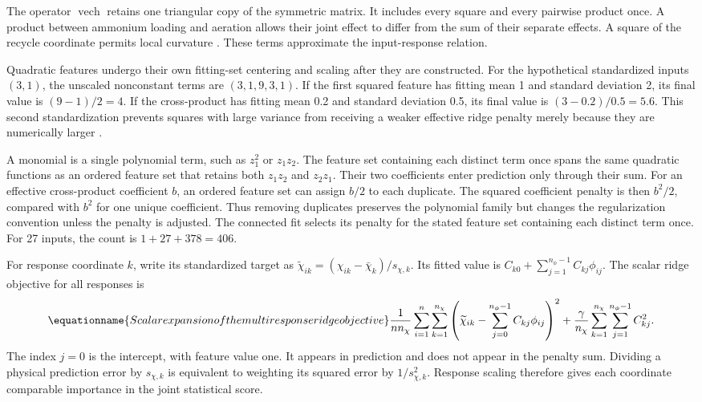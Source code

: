 The operator $\operatorname{vech}$ retains one triangular copy of the symmetric matrix. It includes every square and every pairwise product once. A product between ammonium loading and aeration allows their joint effect to differ from the sum of their separate effects. A square of the recycle coordinate permits local curvature \citep{Nazlabadi2021,Selerio2026}. These terms approximate the input-response relation.

Quadratic features undergo their own fitting-set centering and scaling after they are constructed. For the hypothetical standardized inputs $(3,1)$, the unscaled nonconstant terms are $(3,1,9,3,1)$. If the first squared feature has fitting mean 1 and standard deviation 2, its final value is $(9-1)/2=4$. If the cross-product has fitting mean 0.2 and standard deviation 0.5, its final value is $(3-0.2)/0.5=5.6$. This second standardization prevents squares with large variance from receiving a weaker effective ridge penalty merely because they are numerically larger \citep{Hastie2009}.

A monomial is a single polynomial term, such as $z_1^2$ or $z_1z_2$. The feature set containing each distinct term once spans the same quadratic functions as an ordered feature set that retains both $z_1z_2$ and $z_2z_1$. Their two coefficients enter prediction only through their sum. For an effective cross-product coefficient $b$, an ordered feature set can assign $b/2$ to each duplicate. The squared coefficient penalty is then $b^2/2$, compared with $b^2$ for one unique coefficient. Thus removing duplicates preserves the polynomial family but changes the regularization convention unless the penalty is adjusted. The connected fit selects its penalty for the stated feature set containing each distinct term once. For 27 inputs, the count is $1+27+378=406$.

For response coordinate $k$, write its standardized target as $\widetilde\chi_{ik}=(\chi_{ik}-\bar\chi_k)/s_{\chi,k}$. Its fitted value is $C_{k0}+\sum_{j=1}^{n_\phi-1}C_{kj}\phi_{ij}$. The scalar ridge objective for all responses is
\begin{equation}
\equationname{Scalar expansion of the multiresponse ridge objective}
\frac1{n n_\chi}\sum_{i=1}^{n}\sum_{k=1}^{n_\chi}
\left(\widetilde\chi_{ik}-\sum_{j=0}^{n_\phi-1}C_{kj}\phi_{ij}\right)^2
+\frac{\gamma}{n_\chi}\sum_{k=1}^{n_\chi}\sum_{j=1}^{n_\phi-1}C_{kj}^2.
\end{equation}
The index $j=0$ is the intercept, with feature value one. It appears in prediction and does not appear in the penalty sum. Dividing a physical prediction error by $s_{\chi,k}$ is equivalent to weighting its squared error by $1/s_{\chi,k}^2$. Response scaling therefore gives each coordinate comparable importance in the joint statistical score.


